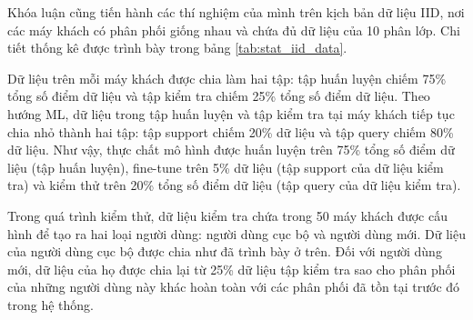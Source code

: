Khóa luận cũng tiến hành các thí nghiệm của mình trên kịch bản dữ liệu IID, nơi các máy khách có phân phối giống nhau và chứa đủ dữ liệu của 10 phân lớp. Chi tiết thống kê được trình bày trong bảng \ref{tab:stat_iid_data}.

\begin{table}
    \caption{Thống kê trên hai tập dữ liệu MNIST và CIFAR-10 (dữ liệu IID)}
    \label{tab:stat_iid_data}
\end{table}

Dữ liệu trên mỗi máy khách được chia làm hai tập: tập huấn luyện chiếm 75\% tổng số điểm dữ liệu và tập kiểm tra chiếm 25\% tổng số điểm dữ liệu. Theo hướng ML, dữ liệu trong tập huấn luyện và tập kiểm tra tại máy khách tiếp tục chia nhỏ thành hai tập: tập support chiếm 20\% dữ liệu và tập query chiếm 80\% dữ liệu. Như vậy, thực chất mô hình được huấn luyện trên 75\% tổng số điểm dữ liệu (tập huấn luyện), fine-tune trên 5\% dữ liệu (tập support của dữ liệu kiểm tra) và kiểm thử trên 20\% tổng số điểm dữ liệu (tập query của dữ liệu kiểm tra).

Trong quá trình kiểm thử, dữ liệu kiểm tra chứa trong 50 máy khách được cấu hình để tạo ra hai loại người dùng: người dùng cục bộ và người dùng mới. Dữ liệu của người dùng cục bộ được chia như đã trình bày ở trên. Đối với người dùng mới, dữ liệu của họ được chia lại từ 25\% dữ liệu tập kiểm tra sao cho phân phối của những người dùng này khác hoàn toàn với các phân phối đã tồn tại trước đó trong hệ thống.

